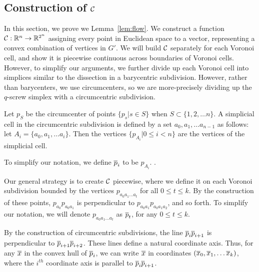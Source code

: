 \subsection{Construction of $\mathcal{C}$}

In this section, we prove we Lemma~\ref{lem:flow}. We construct a function
$\mathcal{C}:\mathbb{R}^n \rightarrow \mathbb{R}^{2^n}$ assigning every point in
Euclidean space to a vector, representing a convex combination of vertices
in $G'$. We will build $\mathcal{C}$ separately for each Voronoi cell, and show
it is piecewise continuous across boundaries of Voronoi cells. 
However, to simplify our arguments, we further divide up each Voronoi cell
into simplices similar to the dissection in a barycentric subdivision.
However, rather than barycenters, we use circumcenters, so we are
more-precisely dividing up the $q$-screw simplex with a circumcentric
subdivision. 

Let $p_{S}$ be the circumcenter of points $\{p_s | s \in S\}$ when $S
\subset \{1, 2, \ldots n\}$. A simplicial cell in the circumcentric subdivision is
defined by a set $a_0, a_1, \ldots a_{n-1}$ as follows: let
$A_i = \{a_0, a_1, \ldots a_{i}\}$. Then the vertices $\{p_{A_i} | 0 \leq i
< n\}$ are the vertices of the simplicial cell.  

To simplify our notation, we define $\overline{p}_i$ to be $p_{A_i}$. .


Our general strategy is to create $\mathcal{C}$ piecewise, where we define it on
each Voronoi subdivision bounded by the vertices $ p_{a_0a_1\ldots a_t}$
for all $0 \leq t \leq k$. By the construction of these points,
$p_{a_0}p_{a_0a_1}$ is perpendicular to $p_{a_0a_1}p_{a_0a_1a_2}$, and so
forth.
To simplify our notation, we will denote $p_{a_0a_1\ldots a_t}$ as $\overline{p}_t$,
for any $0 \leq t \leq k$. 

By the construction of circumcentric subdivisions, 
the line $\overline{p}_{i}\overline{p}_{i+1}$ is perpendicular to
$\overline{p}_{i+1}\overline{p}_{i+2}$. These lines define a natural coordinate axis. Thus,
for any $\overline{x}$ in the convex hull of $\overline{p}_i$, we can write $\overline{x}$ in
coordinates $(\overline{x}_0, \overline{x}_1, \ldots \overline{x}_k)$, where the $i^{th}$ coordinate
axis is parallel to $\overline{p}_i \overline{p}_{i+1}$.

